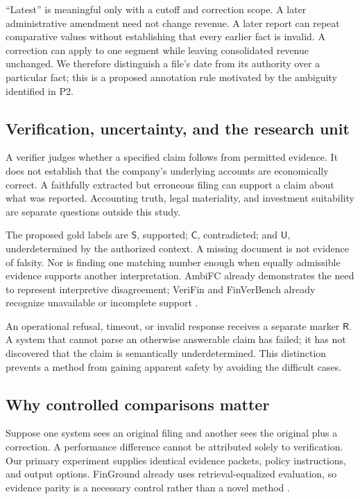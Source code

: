 \documentclass[11pt,a4paper]{article}
\newcommand{\pbreak}{\clearpage}
\newcommand{\Slabel}{\mathsf{S}}
\newcommand{\Clabel}{\mathsf{C}}
\newcommand{\Ulabel}{\mathsf{U}}
\newcommand{\Rlabel}{\mathsf{R}}
\begin{document}
“Latest” is meaningful only with a cutoff and correction scope. A later administrative amendment need not change revenue. A later report can repeat comparative values without establishing that every earlier fact is invalid. A correction can apply to one segment while leaving consolidated revenue unchanged. We therefore distinguish a file's date from its authority over a particular fact; this is a proposed annotation rule motivated by the ambiguity identified in P2.

\pbreak
\subsection{Verification, uncertainty, and the research unit}
A verifier judges whether a specified claim follows from permitted evidence. It does not establish that the company's underlying accounts are economically correct. A faithfully extracted but erroneous filing can support a claim about what was reported. Accounting truth, legal materiality, and investment suitability are separate questions outside this study.

The proposed gold labels are \(\Slabel\), supported; \(\Clabel\), contradicted; and \(\Ulabel\), underdetermined by the authorized context. A missing document is not evidence of falsity. Nor is finding one matching number enough when equally admissible evidence supports another interpretation. AmbiFC already demonstrates the need to represent interpretive disagreement; VeriFin and FinVerBench already recognize unavailable or incomplete support \cite{ambifc,verifin,finverbench}.

An operational refusal, timeout, or invalid response receives a separate marker \(\Rlabel\). A system that cannot parse an otherwise answerable claim has failed; it has not discovered that the claim is semantically underdetermined. This distinction prevents a method from gaining apparent safety by avoiding the difficult cases.

\subsection{Why controlled comparisons matter}
Suppose one system sees an original filing and another sees the original plus a correction. A performance difference cannot be attributed solely to verification. Our primary experiment supplies identical evidence packets, policy instructions, and output options. FinGround already uses retrieval-equalized evaluation, so evidence parity is a necessary control rather than a novel method \cite{finground}.
\end{document}
